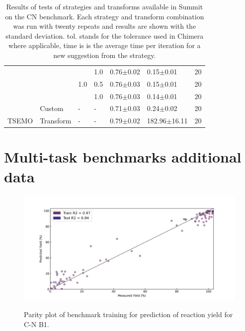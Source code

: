 \begin{table}
\begin{tabular}{lllllll}
              &           &     & 1.0 &        0.76$\pm$0.02 &      0.15$\pm$0.01 &       20 \\
              &           & 1.0 & 0.5 &        0.76$\pm$0.03 &      0.15$\pm$0.01 &       20 \\
              &           &     & 1.0 &        0.76$\pm$0.03 &      0.14$\pm$0.01 &       20 \\
              & Custom & - & - &        0.71$\pm$0.03 &      0.24$\pm$0.02 &       20 \\
        TSEMO & Transform & - & - &        0.79$\pm$0.02 &   182.96$\pm$16.11 &       20 \\
    \end{tabular}
    \caption{Results of tests of strategies and transforms available in Summit on the CN benchmark. Each strategy and transform combination was run with twenty repeats and results are shown with the standard deviation. tol. stands for the tolerance used in Chimera where applicable, time is is the average time per iteration for a new suggestion from the strategy.}
    \label{tab:cn_benchmark}
\end{table}

\section{Multi-task benchmarks additional data}

\begin{figure}
\caption{Parity plot of benchmark training for prediction of reaction yield for C-N B1.}\includegraphics[width=1\textwidth]{gfx/Appendix/baumgartner_cn_case_1_parity_plot.png}
\label{fig:1}
\end{figure}

